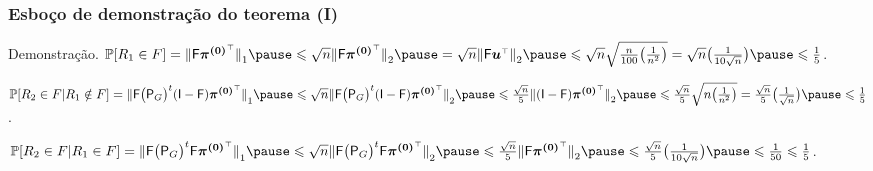 \documentclass{beamer}
\def\Prob{\mathbb{P}} %
\def\leq{\leqslant} %
\def\vetor#1{\boldsymbol{#1}}
\def\matriz#1{\mathsf{#1}}
\def\norma#1#2{{\lVert{#2}\rVert}_{#1}}
\def\transp#1{{#1}^{\scriptscriptstyle \top}}
\theoremstyle{teoaxicorlem}
\theoremstyle{defnotnom}
\begin{document}
\begin{frame}
  \frametitle{Esboço de demonstração do teorema (I)}
  \begin{block}{Demonstração.}
    \footnotesize
    $\Prob[R_1\in F] = \norma1{\matriz F\transp{\vetor{\pi^{(0)}}}}\pause
    \leq \sqrt{n}\norma2{\matriz F\transp{\vetor{\pi^{(0)}}}}\pause
    = \sqrt{n}\norma2{\matriz F\transp{\vetor u}}\pause
    \leq \sqrt{n}\sqrt{\frac{n}{100}\bigl(\frac{1}{n^2}\bigr)}
    = \sqrt{n}\bigl(\frac{1}{10\sqrt n}\bigr) \pause
    \leq \frac15$.\pause

    $\Prob[R_2\in F\vert R_1\notin F]
    = \norma1{\matriz F{\bigl({\matriz P}_G\bigr)}^t(\matriz I-\matriz F)
      \transp{\vetor{\pi^{(0)}}}}\pause
    \leq \sqrt{n}\norma2{\matriz F{\bigl({\matriz P}_G\bigr)}^t(\matriz I-\matriz F)
      \transp{\vetor{\pi^{(0)}}}}\pause
    \leq \frac{\sqrt{n}}5\norma2{(\matriz I-\matriz F)
      \transp{\vetor{\pi^{(0)}}}}\pause
    \leq \frac{\sqrt{n}}5\sqrt{n\bigl(\frac{1}{n^2}\bigr)}
    = \frac{\sqrt{n}}5\bigl(\frac{1}{\sqrt n}\bigr) \pause
    \leq \frac15$.

    $\Prob[R_2\in F\vert R_1\in F]
    = \norma1{\matriz F{\bigl({\matriz P}_G\bigr)}^t\matriz F
      \transp{\vetor{\pi^{(0)}}}}\pause
    \leq \sqrt{n}\norma2{\matriz F{\bigl({\matriz P}_G\bigr)}^t\matriz F
      \transp{\vetor{\pi^{(0)}}}}\pause
    \leq \frac{\sqrt{n}}5\norma2{\matriz F
      \transp{\vetor{\pi^{(0)}}}}\pause
    \leq \frac{\sqrt{n}}5\bigl(\frac{1}{10\sqrt n}\bigr) \pause
    \leq \frac1{50} \leq\frac15$.
  \end{block}
\end{frame}
\end{document}

